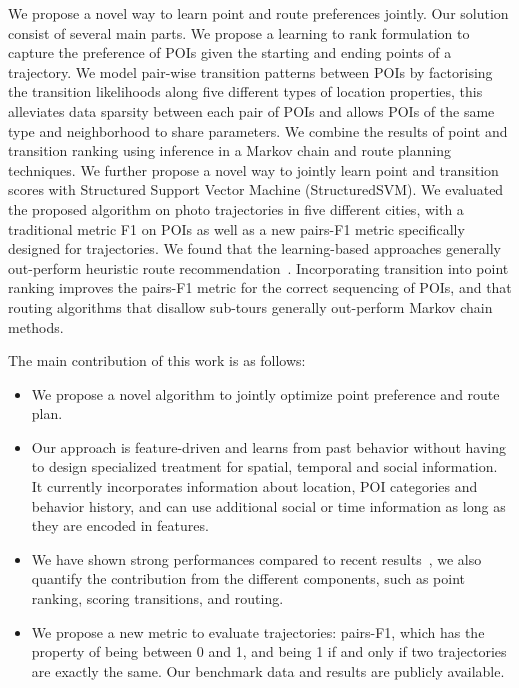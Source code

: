 We propose a novel way to learn point and route preferences jointly. 
Our solution consist of several main parts. 
We propose a learning to rank formulation to capture the preference of POIs given the starting and ending points of a trajectory. We model pair-wise transition patterns between POIs by factorising the transition likelihoods along five different types of location properties, %
this alleviates data sparsity between each pair of POIs and allows POIs of the same type and neighborhood to share parameters.
We combine the results of point and transition ranking using inference in a Markov chain and route planning techniques. We further propose a novel way to jointly learn point and transition scores with Structured Support Vector Machine (StructuredSVM). We evaluated the proposed algorithm on photo trajectories in five different cities, with a traditional metric F1 on POIs as well as a new pairs-F1 metric specifically designed for trajectories. We found that the learning-based approaches generally out-perform heuristic route recommendation~\cite{ijcai15}. Incorporating transition into point ranking improves the pairs-F1 metric for the correct sequencing of POIs, and that routing algorithms that disallow sub-tours generally out-perform Markov chain methods. 


The main contribution of this work is as follows: 
\begin{itemize}
\setlength{\itemsep}{-2pt}
\item We propose a novel algorithm to jointly optimize point preference and route plan.
\item Our approach is feature-driven and learns from past behavior without having to design specialized treatment for spatial, temporal and social information. It currently incorporates information about location, POI categories and behavior history, and can use additional social or time information as long as they are  encoded in features. 
\item We have shown strong performances compared to recent results~\cite{ijcai15}, we also quantify the contribution from the different components, such as point ranking, scoring transitions, and routing. 
\item We propose a new metric to evaluate trajectories: pairs-F1, which has the property of being between 0 and 1, and being 1 if and only if two trajectories are exactly the same. Our benchmark data and results are publicly available.
\end{itemize}
